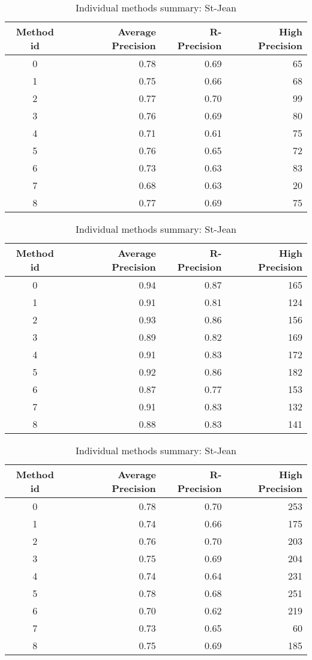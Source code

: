 \begin{table}[H]
  \centering
  \caption{Individual methods summary: St-Jean}
  \label{tab:rls_st_jean}

  \begin{tabular}{c r r r}
    \toprule
    Method id &
    Average Precision &
    R-Precision &
    High Precision \\
    \midrule
    0 & 0.78 & 0.69 & 65 \\
    1 & 0.75 & 0.66 & 68 \\
    2 & 0.77 & 0.70 & 99 \\
    3 & 0.76 & 0.69 & 80 \\
    4 & 0.71 & 0.61 & 75 \\
    5 & 0.76 & 0.65 & 72 \\
    6 & 0.73 & 0.63 & 83 \\
    7 & 0.68 & 0.63 & 20 \\
    8 & 0.77 & 0.69 & 75 \\
    \bottomrule
  \end{tabular}

  \vspace{0.5cm}

  \begin{tabular}{c r r r}
    \toprule
    Method id &
    Average Precision &
    R-Precision &
    High Precision \\
    \midrule
    0 & 0.94 & 0.87 & 165 \\
    1 & 0.91 & 0.81 & 124 \\
    2 & 0.93 & 0.86 & 156 \\
    3 & 0.89 & 0.82 & 169 \\
    4 & 0.91 & 0.83 & 172 \\
    5 & 0.92 & 0.86 & 182 \\
    6 & 0.87 & 0.77 & 153 \\
    7 & 0.91 & 0.83 & 132 \\
    8 & 0.88 & 0.83 & 141 \\
    \bottomrule
  \end{tabular}

  \vspace{0.5cm}

  \begin{tabular}{c r r r}
    \toprule
    Method id &
    Average Precision &
    R-Precision &
    High Precision \\
    \midrule
    0 & 0.78 & 0.70 & 253 \\
    1 & 0.74 & 0.66 & 175 \\
    2 & 0.76 & 0.70 & 203 \\
    3 & 0.75 & 0.69 & 204 \\
    4 & 0.74 & 0.64 & 231 \\
    5 & 0.78 & 0.68 & 251 \\
    6 & 0.70 & 0.62 & 219 \\
    7 & 0.73 & 0.65 &  60 \\
    8 & 0.75 & 0.69 & 185 \\
    \bottomrule
  \end{tabular}
\end{table}
